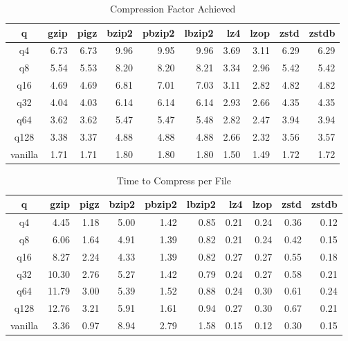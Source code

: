 \begin{table}
\caption{Compression Factor Achieved}
\centering
\begin{tabular}[]{crrrrrrrrr}
\hline
 q        &  gzip & pigz & bzip2 & pbzip2 & lbzip2 & lz4 & lzop & zstd & zstdb  \\
\hline
 q4       &   6.73 &  6.73 &  9.96 &  9.95 &  9.96 &  3.69 &  3.11 &  6.29 &  6.29  \\
 q8       &   5.54 &  5.53 &  8.20 &  8.20 &  8.21 &  3.34 &  2.96 &  5.42 &  5.42  \\
 q16      &   4.69 &  4.69 &  6.81 &  7.01 &  7.03 &  3.11 &  2.82 &  4.82 &  4.82  \\
 q32      &   4.04 &  4.03 &  6.14 &  6.14 &  6.14 &  2.93 &  2.66 &  4.35 &  4.35  \\
 q64      &   3.62 &  3.62 &  5.47 &  5.47 &  5.48 &  2.82 &  2.47 &  3.94 &  3.94  \\
 q128     &   3.38 &  3.37 &  4.88 &  4.88 &  4.88 &  2.66 &  2.32 &  3.56 &  3.57  \\
 vanilla  &   1.71 &  1.71 &  1.80 &  1.80 &  1.80 &  1.50 &  1.49 &  1.72 &  1.72  \\
\hline
\end{tabular}
\label{compress_factor}
\end{table}


\begin{table}
\caption{Time to Compress per File}
\centering
\begin{tabular}[]{crrrrrrrrr}
\hline
 q        &  gzip & pigz & bzip2 & pbzip2 & lbzip2 & lz4 & lzop & zstd & zstdb  \\
\hline
 q4       &    4.45 &   1.18 &   5.00 &   1.42 &   0.85 &   0.21 &   0.24 &   0.36 &   0.12  \\
 q8       &    6.06 &   1.64 &   4.91 &   1.39 &   0.82 &   0.21 &   0.24 &   0.42 &   0.15  \\
 q16      &    8.27 &   2.24 &   4.33 &   1.39 &   0.82 &   0.27 &   0.27 &   0.55 &   0.18  \\
 q32      &   10.30 &   2.76 &   5.27 &   1.42 &   0.79 &   0.24 &   0.27 &   0.58 &   0.21  \\
 q64      &   11.79 &   3.00 &   5.39 &   1.52 &   0.88 &   0.24 &   0.30 &   0.61 &   0.24  \\
 q128     &   12.76 &   3.21 &   5.91 &   1.61 &   0.94 &   0.27 &   0.30 &   0.67 &   0.21  \\
 vanilla  &    3.36 &   0.97 &   8.94 &   2.79 &   1.58 &   0.15 &   0.12 &   0.30 &   0.15  \\
\hline
\end{tabular}
\label{timing_compress}
\end{table}

